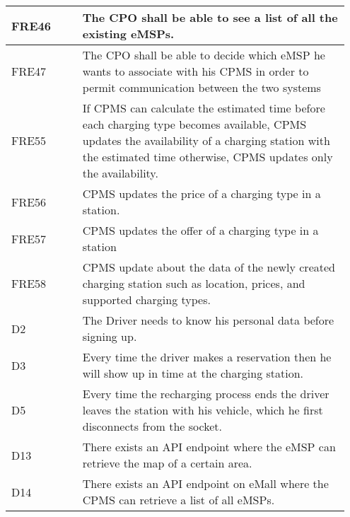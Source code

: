 {\begin{longtable}{|p{0.20\linewidth}p{0.75\linewidth}|}
    \hline
    \rowcolor{bluepoli!15}
    FRE46 & The CPO shall be able to see a list of all the existing eMSPs. \\
    \hline
    \rowcolor{bluepoli!15} FRE47 & The CPO shall be able to decide which eMSP he wants to associate with his CPMS in order to permit communication between the two systems \\
    \hline
    \rowcolor{bluepoli!15} FRE55 & If CPMS can calculate the estimated time before each charging type becomes available, CPMS updates the availability of a charging station with the estimated time otherwise, CPMS updates only the availability. \\
    \hline
    \rowcolor{bluepoli!15} FRE56 & CPMS updates the price of a charging type in a station. \\
    \hline  
    \rowcolor{bluepoli!15} FRE57 & CPMS updates the offer of a charging type in a station \\
    \hline  
     \rowcolor{bluepoli!15}
     FRE58 & CPMS update about the data of the newly created charging station such as location, prices, and supported charging types. \\
     \hline
    \rowcolor{bluepoli!5} D2 & The Driver needs to know his personal data before signing up.  \\
    \hline
    \rowcolor{bluepoli!5} D3 & Every time the driver makes a reservation then he will show up in time at the charging station. \\
    \hline   
    \rowcolor{bluepoli!5} D5 & Every time the recharging process ends the driver leaves the station with his vehicle, which he first disconnects from the socket. \\
    \hline  
    \rowcolor{bluepoli!5} D13 & There exists an API endpoint where the eMSP can retrieve the map of a certain area. \\
    \hline 
    \rowcolor{bluepoli!5} D14 & There exists an API endpoint on eMall where the CPMS can retrieve a list of all eMSPs. \\
    \hline 
\end{longtable}}
